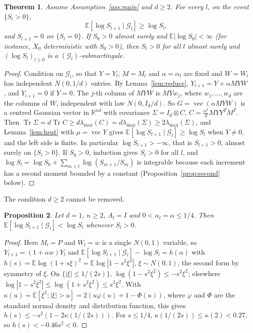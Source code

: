 \documentclass[11pt]{amsart}
\newtheorem{theorem}{Theorem}[section]
\newtheorem{proposition}[theorem]{Proposition}
\theoremstyle{definition}
\theoremstyle{remark}
\numberwithin{equation}{section}
\newcommand{\EE}{\mathbb{E}}
\newcommand{\RR}{\mathbb{R}}
\newcommand{\cG}{\mathcal{G}}
\DeclareMathOperator{\Tr}{Tr}
\DeclareMathOperator{\vect}{vec}
\begin{document}
\begin{theorem}\label{thm:sub}
Assume Assumption~\ref{ass:main} and $d\ge2$. For every $l$, on the event $\{S_l>0\}$,
\[
\EE[\log S_{l+1}\mid\cG_l]\ge\log S_l,
\]
and $S_{l+1}=0$ on $\{S_l=0\}$. If $S_0>0$ almost surely and $\EE|\log S_0|<\infty$ (for instance, $X_0$ deterministic with $S_0>0$), then $S_l>0$ for all $l$ almost surely and $(\log S_l)_{l\ge0}$ is a $(\cG_l)$-submartingale.
\end{theorem}

\begin{proof}
Condition on $\cG_l$, so that $Y=Y_l$, $M=M_l$ and $\alpha=\alpha_l$ are fixed and $W=W_l$ has independent $N(0,1/d)$ entries. By Lemma~\ref{lem:reduce}, $Y_{l+1}=Y+\alpha MYW$, and $Y_{l+1}=0$ if $Y=0$. The $j$-th column of $MYW$ is $MYw_j$, where $w_1,\dots,w_d$ are the columns of $W$, independent with law $N(0,I_d/d)$. So $G=\vect(\alpha MYW)$ is a centred Gaussian vector in $\RR^{nd}$ with covariance $\Sigma=I_d\otimes C$, $C=\frac{\alpha^2}dMYY^{T}M^{T}$. Then $\Tr\Sigma=d\Tr C\ge d\lambda_{\max}(C)=d\lambda_{\max}(\Sigma)\ge2\lambda_{\max}(\Sigma)$, and Lemma~\ref{lem:heat} with $\mu=\vect Y$ gives $\EE[\log S_{l+1}\mid\cG_l]\ge\log S_l$ when $Y\ne0$, and the left side is finite. In particular $\log S_{l+1}>-\infty$, that is $S_{l+1}>0$, almost surely on $\{S_l>0\}$. If $S_0>0$, induction gives $S_l>0$ for all $l$, and $\log S_l=\log S_0+\sum_{m<l}\log(S_{m+1}/S_m)$ is integrable because each increment has a second moment bounded by a constant (Proposition~\ref{prop:second} below).
\end{proof}

The condition $d\ge2$ cannot be removed.

\begin{proposition}\label{prop:d1}
Let $d=1$, $n\ge2$, $A_l=I$ and $0<\alpha_l=\alpha\le1/4$. Then $\EE[\log S_{l+1}\mid\cG_l]<\log S_l$ whenever $S_l>0$.
\end{proposition}

\begin{proof}
Here $M_l=P$ and $W_l=w$ is a single $N(0,1)$ variable, so $Y_{l+1}=(1+\alpha w)Y_l$ and $\EE[\log S_{l+1}\mid\cG_l]-\log S_l=h(\alpha)$ with $h(s)=\EE\log(1+s\xi)^2=\EE\log|1-s^2\xi^2|$, $\xi\sim N(0,1)$, the second form by symmetry of $\xi$. On $\{|\xi|\le1/(2s)\}$, $\log(1-s^2\xi^2)\le-s^2\xi^2$; elsewhere $\log|1-s^2\xi^2|\le\log(1+s^2\xi^2)\le s^2\xi^2$. With $\kappa(u)=\EE[\xi^2;|\xi|>u]=2(u\varphi(u)+1-\Phi(u))$, where $\varphi$ and $\Phi$ are the standard normal density and distribution function, this gives $h(s)\le-s^2(1-2\kappa(1/(2s)))$. For $s\le1/4$, $\kappa(1/(2s))\le\kappa(2)<0.27$, so $h(s)<-0.46s^2<0$.
\end{proof}
\end{document}
